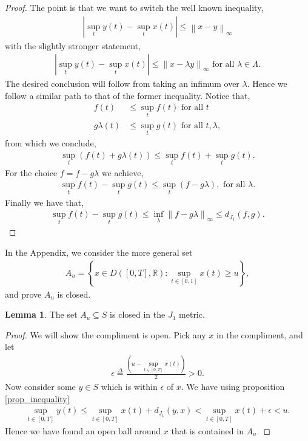 \documentclass[12pt]{article}
\newcommand{\R}{\mathbb{R}}
\newcommand\norm[1]{\left\lVert#1\right\rVert}
\newcommand{\define}{\overset{\Delta}{=}}
\theoremstyle{definition}
\theoremstyle{definition}
\newtheorem{lemma}{Lemma}
\theoremstyle{definition}
\begin{document}
\begin{proof} The point is that we want to switch the well known inequality,
\begin{align*}
|\sup_t y(t)-\sup_t x(t)|\leq \norm{x-y}_{\infty}
\end{align*}
with the slightly stronger statement,
\begin{align*}
|\sup_t y(t)-\sup_t x(t)|\leq \norm{x-\lambda y}_{\infty} \text{ for all $\lambda\in \Lambda$}.
\end{align*}
The desired conclusion will follow from taking an infimum over $\lambda$. Hence we follow a similar path to that of the former inequality. Notice that,
\begin{align*}
f(t)&\leq \sup_t f(t) \text{ for all $t$}\\
g\lambda(t)&\leq \sup_t g(t) \text{ for all $t,\lambda$},
\end{align*}
from which we conclude,
\begin{align*}
\sup_t\left(f(t)+g\lambda(t)\right)\leq \sup_t f(t)+\sup_t g(t).
\end{align*}
For the choice $f=f-g\lambda$ we achieve,
\begin{align*}
\sup_t f(t)-\sup_t g(t)\leq \sup_t (f-g\lambda), \text{ for all $\lambda$}.
\end{align*}
Finally we have that,
\begin{align*}
\sup_t f(t)-\sup_t g(t)\leq \inf_{\lambda}\norm{f-g\lambda}_{\infty}\leq d_{J_1}(f,g).
\end{align*}
\end{proof}
In the Appendix, we consider the more general set 
\begin{align*}
A_u = \left\{x\in D\left([0,T],\R\right): \sup_{t\in[0,1]} x(t)\geq u\right\},
\end{align*}
and prove $A_u$ is closed.

\begin{lemma}
The set $A_u\subseteq S$ is closed in the $J_1$ metric. 
\end{lemma}
\begin{proof}
We will show the compliment is open. Pick any $x$ in the compliment, and let 
\begin{align*}
\epsilon \define \frac{\left(u-\sup_{t\in[0,T]} x(t)\right)}{2}>0.
\end{align*}
Now consider some $y\in S$ which is within $\epsilon$ of $x$. We have using proposition \ref{prop_inequality}
\begin{align*}
\sup_{t\in [0,T]}y(t)\leq \sup_{t\in[0,T]}x(t) +d_{J_1}(y,x) < \sup_{t\in[0,T]}x(t)+ \epsilon<u.
\end{align*}
Hence we have found an open ball around $x$ that is contained in $A_u$. 
\end{proof}
\end{document}
